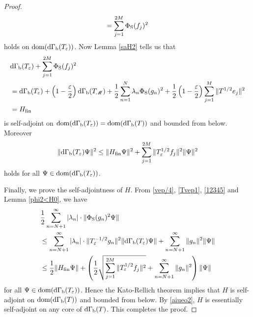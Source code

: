 \documentclass[12pt]{article}
\theoremstyle{plain}
\numberwithin{equation}{section}
\theoremstyle{remark}
\begin{document}
\begin{proof}
\begin{equation*}
= \sum_{j=1}^{2M} \Phi_\mathrm{S}(f_j)^2
\end{equation*}
holds on $\mathop{\mathrm{dom}}(\mathrm{d\Gamma_b}(T_\varepsilon))$.
Now Lemma \ref{saH2} tells us that 
\begin{align*}
&\mathrm{d\Gamma_b}(T_\varepsilon)+\sum_{j=1}^{2M} \Phi_\mathrm{S}(f_j)^2\\
&=\mathrm{d\Gamma_b}(T_\varepsilon) + \left(1-\frac{\varepsilon}{2}\right)\mathrm{d\Gamma_b}(T_\mathscr{M}) + \frac{1}{2}\sum_{n=1}^N \lambda_n \Phi_\mathrm{S}(g_n)^2 + \frac{1}{2}\left(1-\frac{\varepsilon}{2}\right) \sum_{j=1}^M \| T^{1/2}e_j \|^2\\
&=H_{\rm fin}
\end{align*}
is self-adjoint on $\mathop{\mathrm{dom}}(\mathrm{d\Gamma_b}(T_\varepsilon))=\mathop{\mathrm{dom}}(\mathrm{d\Gamma_b}(T))$ and bounded from below.
Moreover
\begin{equation}\label{12345}
\|\mathrm{d\Gamma_b}(T_\varepsilon)\Psi\|^2  \leq \|H_{\rm fin}\Psi\|^2 + \sum_{j=1}^{2M}\|T_\varepsilon^{1/2}f_j\|^2\|\Psi\|^2
\end{equation}
holds for all $\Psi\in\mathop{\mathrm{dom}}(\mathrm{d\Gamma_b}(T_\varepsilon))$.

Finally, we prove the self-adjointness of $H$. 
From \eqref{vep/4}, \eqref{Tvep1}, \eqref{12345} and Lemma \ref{phi2<H0}, we have
\begin{align*}
&\frac{1}{2}\sum_{n=N+1}^\infty|\lambda_n|\cdot\|\Phi_\mathrm{S}(g_n)^2\Psi\|\\
&\leq \sum_{n=N+1}^\infty|\lambda_n|\cdot\|T_\varepsilon^{-1/2}g_n\|^2\|\mathrm{d\Gamma_b}(T_\varepsilon)\Psi\| + \sum_{n=N+1}^\infty\|g_n\|^2\|\Psi\|\\
&\leq \frac{1}{2}\|H_{\rm fin}\Psi\| 
+\left(\frac{1}{2}\sqrt{\sum_{j=1}^{2M}\|T_\varepsilon^{1/2}f_j\|^2}+\sum_{n=N+1}^\infty\|g_n\|^2\right)\|\Psi\|
\end{align*}
for all $\Psi\in\mathop{\mathrm{dom}}(\mathrm{d\Gamma_b}(T_\varepsilon))$.
Hence the Kato-Rellich theorem implies that $H$ is self-adjoint on $\mathop{\mathrm{dom}}(\mathrm{d\Gamma_b}(T))$ and bounded from below.
By \eqref{aiueo2}, $H$ is essentially self-adjoint on any core of $\mathrm{d\Gamma_b}(T)$.
This completes the proof.
\end{proof}



\end{document}
